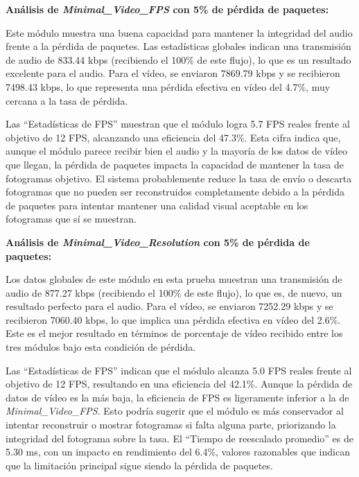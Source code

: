 \vspace{\baselineskip}

\textbf{Análisis de \textit{Minimal\_Video\_FPS} con 5\% de pérdida de paquetes:}
\vspace{\baselineskip}

Este módulo muestra una buena capacidad para mantener la integridad del audio frente a la pérdida de paquetes. Las estadísticas globales indican una transmisión de audio de 833.44 kbps (recibiendo el 100\% de este flujo), lo que es un resultado excelente para el audio. Para el vídeo, se enviaron 7869.79 kbps y se recibieron 7498.43 kbps, lo que representa una pérdida efectiva en vídeo del 4.7\%, muy cercana a la tasa de pérdida.
\vspace{\baselineskip}

Las ``Estadísticas de FPS'' muestran que el módulo logra 5.7 FPS reales frente al objetivo de 12 FPS, alcanzando una eficiencia del 47.3\%. Esta cifra indica que, aunque el módulo parece recibir bien el audio y la mayoría de los datos de vídeo que llegan, la pérdida de paquetes impacta la capacidad de mantener la tasa de fotogramas objetivo. El sistema probablemente reduce la tasa de envío o descarta fotogramas que no pueden ser reconstruidos completamente debido a la pérdida de paquetes para intentar mantener una calidad visual aceptable en los fotogramas que sí se muestran.

\vspace{\baselineskip}

\textbf{Análisis de \textit{Minimal\_Video\_Resolution} con 5\% de pérdida de paquetes:}
\vspace{\baselineskip}

Los datos globales de este módulo en esta prueba muestran una transmisión de audio de 877.27 kbps (recibiendo el 100\% de este flujo), lo que es, de nuevo, un resultado perfecto para el audio. Para el vídeo, se enviaron 7252.29 kbps y se recibieron 7060.40 kbps, lo que implica una pérdida efectiva en vídeo del 2.6\%. Este es el mejor resultado en términos de porcentaje de vídeo recibido entre los tres módulos bajo esta condición de pérdida.
\vspace{\baselineskip}

Las ``Estadísticas de FPS'' indican que el módulo alcanza 5.0 FPS reales frente al objetivo de 12 FPS, resultando en una eficiencia del 42.1\%. Aunque la pérdida de datos de vídeo es la más baja, la eficiencia de FPS es ligeramente inferior a la de \textit{Minimal\_Video\_FPS}. Esto podría sugerir que el módulo es más conservador al intentar reconstruir o mostrar fotogramas si falta alguna parte, priorizando la integridad del fotograma sobre la tasa. El ``Tiempo de reescalado promedio'' es de 5.30 ms, con un impacto en rendimiento del 6.4\%, valores razonables que indican que la limitación principal sigue siendo la pérdida de paquetes.

